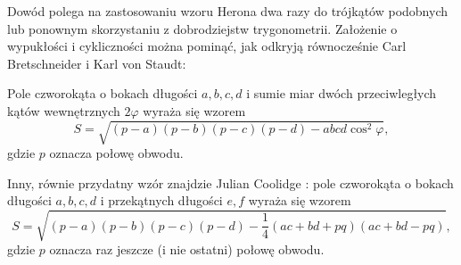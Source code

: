 Dowód polega na zastosowaniu wzoru Herona dwa razy do trójkątów podobnych lub ponownym skorzystaniu z dobrodziejstw trygonometrii.
Założenie o wypukłości i cykliczności można pominąć, jak odkryją równocześnie Carl Bretschneider i Karl von Staudt:
%
%

\begin{proposition}
    Pole czworokąta o bokach długości $a, b, c, d$ i sumie miar dwóch przeciwległych kątów wewnętrznych $2 \varphi$ wyraża się wzorem
    \begin{equation}
        S = \sqrt{(p-a)(p-b)(p-c)(p-d) - abcd \cos^2  \varphi},
    \end{equation}
    gdzie $p$ oznacza połowę obwodu.
\end{proposition}
%

Inny, równie przydatny wzór znajdzie Julian Coolidge \cite{coolidge_1939}:
%
pole czworokąta o bokach długości $a, b, c, d$ i przekątnych długości $e, f$ wyraża się wzorem
\begin{equation}
    S = \sqrt{(p-a)(p-b)(p-c)(p-d) - \frac 1 4 (ac + bd + pq)(ac + bd - pq)},
\end{equation}
gdzie $p$ oznacza raz jeszcze (i nie ostatni) połowę obwodu.

%

